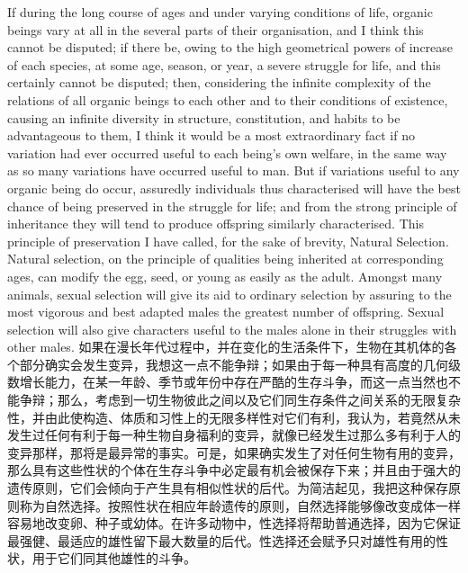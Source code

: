 \darwinpair
{If during the long course of ages and under varying conditions of life, organic beings vary at all in the several parts of their organisation, and I think this cannot be disputed; if there be, owing to the high geometrical powers of increase of each species, at some age, season, or year, a severe struggle for life, and this certainly cannot be disputed; then, considering the infinite complexity of the relations of all organic beings to each other and to their conditions of existence, causing an infinite diversity in structure, constitution, and habits to be advantageous to them, I think it would be a most extraordinary fact if no variation had ever occurred useful to each being's own welfare, in the same way as so many variations have occurred useful to man. But if variations useful to any organic being do occur, assuredly individuals thus characterised will have the best chance of being preserved in the struggle for life; and from the strong principle of inheritance they will tend to produce offspring similarly characterised. This principle of preservation I have called, for the sake of brevity, Natural Selection. Natural selection, on the principle of qualities being inherited at corresponding ages, can modify the egg, seed, or young as easily as the adult. Amongst many animals, sexual selection will give its aid to ordinary selection by assuring to the most vigorous and best adapted males the greatest number of offspring. Sexual selection will also give characters useful to the males alone in their struggles with other males.}
{如果在漫长年代过程中，并在变化的生活条件下，生物在其机体的各个部分确实会发生变异，我想这一点不能争辩；如果由于每一种具有高度的几何级数增长能力，在某一年龄、季节或年份中存在严酷的生存斗争，而这一点当然也不能争辩；那么，考虑到一切生物彼此之间以及它们同生存条件之间关系的无限复杂性，并由此使构造、体质和习性上的无限多样性对它们有利，我认为，若竟然从未发生过任何有利于每一种生物自身福利的变异，就像已经发生过那么多有利于人的变异那样，那将是最异常的事实。可是，如果确实发生了对任何生物有用的变异，那么具有这些性状的个体在生存斗争中必定最有机会被保存下来；并且由于强大的遗传原则，它们会倾向于产生具有相似性状的后代。为简洁起见，我把这种保存原则称为自然选择。按照性状在相应年龄遗传的原则，自然选择能够像改变成体一样容易地改变卵、种子或幼体。在许多动物中，性选择将帮助普通选择，因为它保证最强健、最适应的雄性留下最大数量的后代。性选择还会赋予只对雄性有用的性状，用于它们同其他雄性的斗争。}

